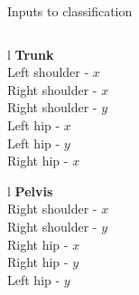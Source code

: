 \begin{frame}[fragile]{Inputs to classification}
  \begin{columns}
    \column{\dimexpr\paperwidth-20pt}
  \begin{table}
    \caption{Input variables for the different POEs. Videos have been mirrored such that action is performed with right leg, if applicable.}
      \begin{center}
          \tabulinesep=0.8mm
          \begin{minipage}[t]{0.25\textwidth}
            \begin{tabu}[t]{l}
              \small
              \textbf{Trunk} \\ \hline \hline
              Left shoulder - $x$\\
              Right shoulder - $x$\\
              Right shoulder - $y$\\
              Left hip - $x$\\
              Left hip - $y$\\
              Right hip - $x$\\
            \end{tabu}
          \end{minipage}%
          \begin{minipage}[t]{0.25\textwidth}
            \begin{tabu}[t]{l}
              \small
              \textbf{Pelvis} \\ \hline \hline
              Right shoulder - $x$\\
              Right shoulder - $y$\\
              Right hip - $x$\\
              Right hip - $y$\\
              Left hip - $y$\\
              \\

\end{tabu}
\end{minipage}
\end{center}
\end{table}
\end{columns}
\end{frame}
